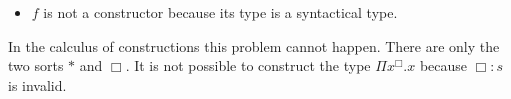 \begin{definition}
\begin{enumerate}
\begin{itemize}
        \item $f$ is not a constructor because its type is a syntactical type.

        \end{itemize}

        In the calculus of constructions this problem cannot happen. There are
        only the two sorts $ * $ and
        $\Box$. It is not possible to construct the
        type $\Pi x^\Box. x$ because $\Box: s$ is invalid.
    \end{enumerate}
\end{definition}
